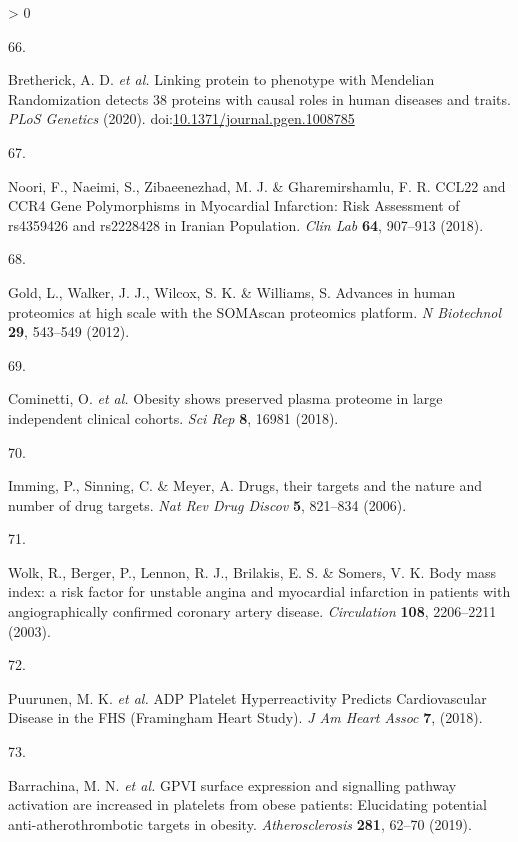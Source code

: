 \documentclass[11pt,twoside]{bristolthesis}
\newlength{\cslhangindent}
\newlength{\csllabelwidth}
\newenvironment{CSLReferences}[2] %
 {%
  \setlength{\parindent}{0pt}
  \ifodd #1 \everypar{\setlength{\hangindent}{\cslhangindent}}\ignorespaces\fi
  \ifnum #2 > 0
  \setlength{\parskip}{#2\baselineskip}
  \fi
 }%
 {}
\newcommand{\CSLLeftMargin}[1]{\parbox[t]{\csllabelwidth}{#1}}
\newcommand{\CSLRightInline}[1]{\parbox[t]{\linewidth - \csllabelwidth}{#1}\break}
\begin{document}
\begin{CSLReferences}{0}{0}
\leavevmode\hypertarget{ref-Bretherick2020}{}%
\CSLLeftMargin{66. }
\CSLRightInline{Bretherick, A. D. \emph{et al.} {Linking protein to phenotype with Mendelian Randomization detects 38 proteins with causal roles in human diseases and traits}. \emph{PLoS Genetics} (2020). doi:\href{https://doi.org/10.1371/journal.pgen.1008785}{10.1371/journal.pgen.1008785}}

\leavevmode\hypertarget{ref-Noori2018}{}%
\CSLLeftMargin{67. }
\CSLRightInline{Noori, F., Naeimi, S., Zibaeenezhad, M. J. \& Gharemirshamlu, F. R. {CCL22 and CCR4 Gene Polymorphisms in Myocardial Infarction: Risk Assessment of rs4359426 and rs2228428 in Iranian Population}. \emph{Clin Lab} \textbf{64}, 907--913 (2018).}

\leavevmode\hypertarget{ref-Gold2012}{}%
\CSLLeftMargin{68. }
\CSLRightInline{Gold, L., Walker, J. J., Wilcox, S. K. \& Williams, S. {Advances in human proteomics at high scale with the SOMAscan proteomics platform}. \emph{N Biotechnol} \textbf{29}, 543--549 (2012).}

\leavevmode\hypertarget{ref-Cominetti2018}{}%
\CSLLeftMargin{69. }
\CSLRightInline{Cominetti, O. \emph{et al.} {Obesity shows preserved plasma proteome in large independent clinical cohorts}. \emph{Sci Rep} \textbf{8}, 16981 (2018).}

\leavevmode\hypertarget{ref-Imming2006}{}%
\CSLLeftMargin{70. }
\CSLRightInline{Imming, P., Sinning, C. \& Meyer, A. {Drugs, their targets and the nature and number of drug targets}. \emph{Nat Rev Drug Discov} \textbf{5}, 821--834 (2006).}

\leavevmode\hypertarget{ref-Wolk2003a}{}%
\CSLLeftMargin{71. }
\CSLRightInline{Wolk, R., Berger, P., Lennon, R. J., Brilakis, E. S. \& Somers, V. K. {Body mass index: a risk factor for unstable angina and myocardial infarction in patients with angiographically confirmed coronary artery disease}. \emph{Circulation} \textbf{108}, 2206--2211 (2003).}

\leavevmode\hypertarget{ref-Puurunen2018}{}%
\CSLLeftMargin{72. }
\CSLRightInline{Puurunen, M. K. \emph{et al.} {ADP Platelet Hyperreactivity Predicts Cardiovascular Disease in the FHS (Framingham Heart Study)}. \emph{J Am Heart Assoc} \textbf{7}, (2018).}

\leavevmode\hypertarget{ref-Barrachina2019}{}%
\CSLLeftMargin{73. }
\CSLRightInline{Barrachina, M. N. \emph{et al.} {GPVI surface expression and signalling pathway activation are increased in platelets from obese patients: Elucidating potential anti-atherothrombotic targets in obesity}. \emph{Atherosclerosis} \textbf{281}, 62--70 (2019).}


\end{CSLReferences}
\end{document}
